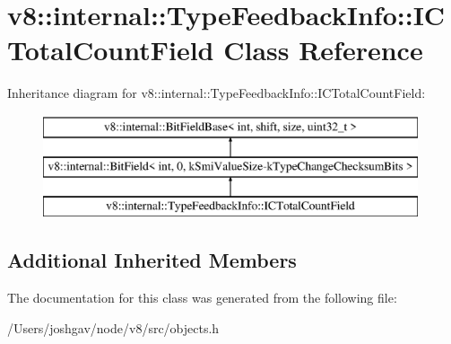 \hypertarget{classv8_1_1internal_1_1_type_feedback_info_1_1_i_c_total_count_field}{}\section{v8\+:\+:internal\+:\+:Type\+Feedback\+Info\+:\+:I\+C\+Total\+Count\+Field Class Reference}
\label{classv8_1_1internal_1_1_type_feedback_info_1_1_i_c_total_count_field}
Inheritance diagram for v8\+:\+:internal\+:\+:Type\+Feedback\+Info\+:\+:I\+C\+Total\+Count\+Field\+:\begin{figure}[H]
\begin{center}
\leavevmode
\includegraphics[height=3.000000cm]{classv8_1_1internal_1_1_type_feedback_info_1_1_i_c_total_count_field}
\end{center}
\end{figure}
\subsection*{Additional Inherited Members}


The documentation for this class was generated from the following file\+:\begin{DoxyCompactItemize}
\item 
/\+Users/joshgav/node/v8/src/objects.\+h\end{DoxyCompactItemize}
